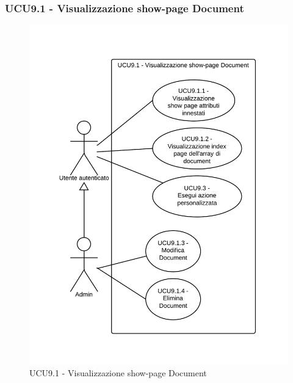 \subsubsection{UCU9.1 - Visualizzazione show-page Document} 
    \begin{center}
    \begin{figure}[H]
      \includegraphics[scale=0.16]{UML/UCU9.1 - Visualizzazione show-page Document.png}
      \caption{UCU9.1 - Visualizzazione show-page Document} 
    \end{figure}
    \end{center}
    
